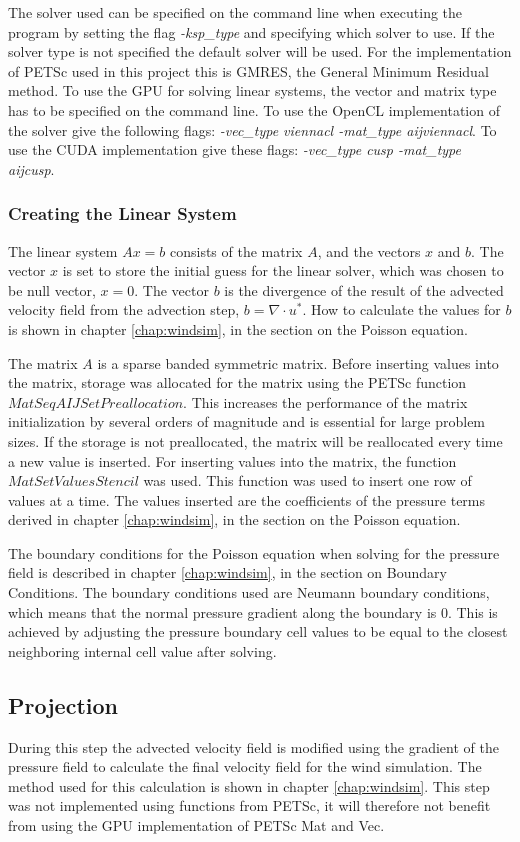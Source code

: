 The solver used can be specified on the command line when executing the program
by setting the flag \emph{-ksp\_type} and specifying which solver to use. If the 
solver type is not specified the default solver will be used. For the
implementation of PETSc used in this project this is GMRES, the General Minimum
Residual method. To use the GPU for solving linear systems, the vector and matrix
type has to be specified on the command line. To use the OpenCL implementation of
the solver give the following flags: \emph{-vec\_type viennacl -mat\_type aijviennacl}.
To use the CUDA implementation give these flags: \emph{-vec\_type cusp -mat\_type
aijcusp}.

\subsubsection{Creating the Linear System}

The linear system $Ax = b$ consists of the matrix $A$, and the vectors $x$ and
$b$. The vector $x$ is set to store the initial guess for the linear solver,
which was chosen to be null vector, $x = 0$. The vector $b$ is the divergence of
the result of the advected velocity field from the advection step, $b = \nabla
\cdot u^*$. How to calculate the values for $b$ is shown in chapter 
\ref{chap:windsim}, in the section on the Poisson equation.

The matrix $A$ is a sparse banded symmetric matrix. Before inserting values into
the matrix, storage was allocated for the matrix using the PETSc function
$MatSeqAIJSetPreallocation$. This increases the performance of the matrix
initialization by several orders of magnitude and is essential for large problem
sizes. If the storage is not preallocated, the matrix will be reallocated every
time a new value is inserted. For inserting values into the matrix, the function
$MatSetValuesStencil$ was used. This function was used to insert one row of 
values at a time. The values inserted are the coefficients of the pressure terms
derived in chapter \ref{chap:windsim}, in the section on the Poisson equation.

The boundary conditions for the Poisson equation when solving for the pressure
field is described in chapter \ref{chap:windsim}, in the section on Boundary
Conditions. The boundary conditions used are Neumann boundary conditions, which
means that the normal pressure gradient along the boundary is 0. This is achieved
by adjusting the pressure boundary cell values to be equal to the closest
neighboring internal cell value after solving.

\subsection{Projection}

During this step the advected velocity field is modified using the gradient of
the pressure field to calculate the final velocity field for the wind simulation.
The method used for this calculation is shown in chapter \ref{chap:windsim}.
This step was not implemented using functions from PETSc, it will therefore not
benefit from using the GPU implementation of PETSc Mat and Vec.
